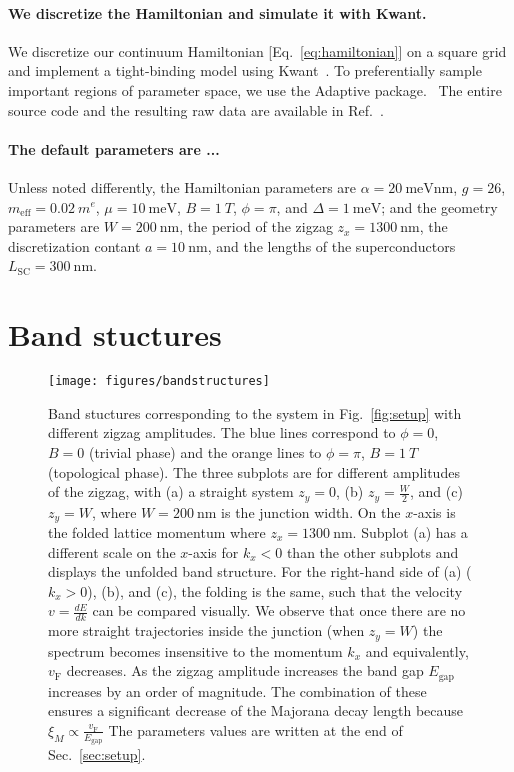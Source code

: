 \documentclass[english, twocolumn, 10pt, aps, superscriptaddress, floatfix, prb, citeautoscript]{revtex4-1}
\newcommand{\meff}{m_\text{eff}}
\renewcommand{\comment}[2]{#2}
\renewcommand{\comment}{\paragraph}
\begin{document}
\comment{We discretize the Hamiltonian and simulate it with Kwant.}
We discretize our continuum Hamiltonian [Eq.~\eqref{eq:hamiltonian}] on a square grid and implement a tight-binding model using Kwant~\cite{groth_kwant:_2014}.
To preferentially sample important regions of parameter space, we use the Adaptive package.~\cite{adaptive}
The entire source code and the resulting raw data are available in Ref.~.  %

\comment{The default parameters are ...}
Unless noted differently, the Hamiltonian parameters are $\alpha=\SI{20}{\meV \nm}$, $g=26$, $\meff=\SI{0.02}{\electronmass}$, $\mu=\SI{10}{\meV}$, $B=\SI{1}{T}$, $\phi=\pi$, and $\Delta=\SI{1}{\meV}$; and the geometry parameters are $W=\SI{200}{\nm}$, the period of the zigzag $z_x=\SI{1300}{\nm}$, the discretization contant $a=\SI{10}{\nm}$, and the lengths of the superconductors $L_\textrm{SC}=\SI{300}{\nm}$.  %


\section{Band stuctures}\label{sec:band_structures}

\begin{figure}[!htb]
\texttt{[image: figures/bandstructures]}
\caption{Band stuctures corresponding to the system in Fig.~\ref{fig:setup} with different zigzag amplitudes.
The blue lines correspond to $\phi=0$, $B=0$ (trivial phase) and the orange lines to $\phi=\pi$, $B = \SI{1}{T}$ (topological phase).
The three subplots are for different amplitudes of the zigzag, with (a) a straight system $z_y=0$, (b) $z_y=\frac{W}{2}$, and (c) $z_y=W$, where $W=\SI{200}{\nm}$ is the junction width.
On the $x$-axis is the folded lattice momentum where $z_x=\SI{1300}{\nm}$.
Subplot (a) has a different scale on the $x$-axis for $k_x < 0$ than the other subplots and displays the unfolded band structure.
For the right-hand side of (a) ($k_x > 0$), (b), and (c), the folding is the same, such that the velocity $v=\frac{dE}{dk}$ can be compared visually.
We observe that once there are no more straight trajectories inside the junction (when $z_y=W$) the spectrum becomes insensitive to the momentum $k_x$ and equivalently, $v_\textrm{F}$ decreases.
As the zigzag amplitude increases the band gap $E_\textrm{gap}$ increases by an order of magnitude.
The combination of these ensures a significant decrease of the Majorana decay length because $\xi_M \propto \frac{v_\textrm{F}}{E_\textrm{gap}}$
The parameters values are written at the end of Sec.~\ref{sec:setup}.\label{fig:band_structures}}
\end{figure}
\end{document}
